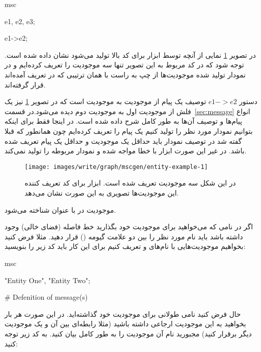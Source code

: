 \begin{MSC}
msc {
	e1, e2, e3;
	
	e1->e2;	
}
\end{MSC}

در تصویر \ref{images/write/graph/mscgen/entity-example-1} نمایی از آنچه توسط
ابزار  برای کد بالا تولید می‌شود نشان داده شده است. توجه شود که در کد
مربوط به این تصویر تنها سه موجودیت را تعریف کرده‌ایم و در نمودار تولید شده
موجودیت‌ها از چپ به راست با همان ترتیبی که در تعریف آمده‌اند قرار گرفته‌اند.

\begin{note}
دستور $e1->e2$ توصیف یک پیام از موجودیت  به موجودیت  است که در 
تصویر \ref{images/write/graph/mscgen/entity-example-1} نیز یک فلش از موجودیت اول
به موجودیت دوم دیده می‌شود.در قسمت~\ref{sec:message} انواع پیام‌ها و توصیف آن‌ها
به طور کامل شرح داده شده است.
در اینجا فقط برای اینکه بتوانیم نمودار مورد نظر را تولید کنیم یک پیام را تعریف کرده‌ایم
چون همانطور که قبلا گفته شد در توصیف نمودار باید حداقل یک موجودیت و حداقل یک پیام تعریف شده باشد.
در غیر این صورت ابزار  با خطا مواجه شده و نمودار مربوطه را تولید نمی‌کند.
\end{note}

\begin{figure}[h]
	\centering
	\texttt{[image: images/write/graph/mscgen/entity-example-1]}
	\caption[مثالی از نحوه نمایش موجودیت‌ها توسط ابزار ]
	{در این شکل سه موجودیت تعریف شده است. ابزار  برای کد تعریف کننده این موجودیت‌ها 
	تصویری به این صورت نشان می‌دهد.}
	\label{images/write/graph/mscgen/entity-example-1}
\end{figure}

\begin{note}
موجودیت در  با عنوان  شناخته می‌شود.
\end{note}

اگر در نامی که می‌خواهید برای موجودیت خود بگذارید خط فاصله (فضای خالی) وجود
داشته باشد باید نام مورد نظر را بین دو علامت گیومه () قرار دهید. مثلا فرض
کنید بخواهیم موجودیت‌هایی با نام‌های  و  تعریف
کنیم برای این کار باید کد زیر را بنویسید:

\begin{MSC}
msc {
	"Entity One", "Entity Two";
	
	# Defenition of message(s)
}
\end{MSC}

حال فرض کنید نامی طولانی برای موجودیت خود گذاشته‌اید. در این صورت هر بار بخواهید
به این موجودیت ارجاعی داشته باشید (مثلا رابطه‌ای بین آن و یک موجودیت دیگر برقرار
کنید) مجبورید نام آن موجودیت را به طور کامل بیان کنید. به کد زیر توجه کنید:

